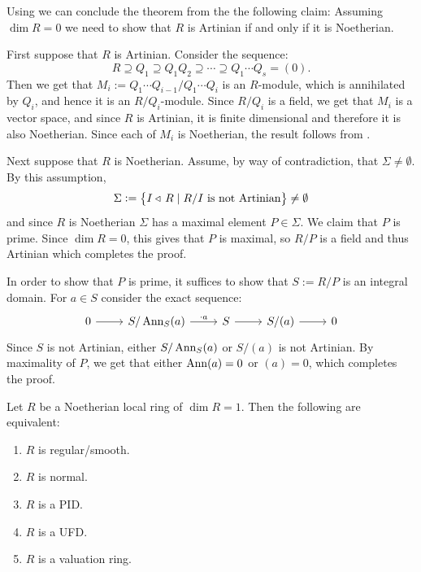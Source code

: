 \documentclass[11pt,a4paper]{article}
\begin{document}
\begin{proofof}{}
  Using  we can conclude the theorem from the
  the following claim:
  Assuming $\dim R = 0$ we need to show that $R$ is Artinian
  if and only if it is Noetherian.

  First suppose that $R$ is Artinian.
  Consider the sequence:
  \[
    R \supseteq Q_1 \supseteq Q_1 Q_2 \supseteq \cdots \supseteq Q_1 \cdots Q_s = (0).
  \]
  Then we get that $M_i := Q_1 \cdots Q_{i-1} / Q_1 \cdots Q_i$ is an $R$-module,
  which is annihilated by $Q_i$, and hence it is an $R/Q_i$-module.
  Since $R/Q_i$ is a field, we get that $M_i$ is a vector space,
  and since $R$ is Artinian, it is finite dimensional and therefore
  it is also Noetherian.
  Since each of $M_i$ is Noetherian,
  the result follows from .

  Next suppose that $R$ is Noetherian.
  Assume, by way of contradiction, that $\Sigma \neq \emptyset$.
  By this assumption,
  \[
    \Sigma := \left\{I \triangleleft\, R \mid \text{$R/I$ is not Artinian}\right\} \neq \emptyset
  \]
  and since $R$ is Noetherian $\Sigma$ has a maximal element $P \in \Sigma$.
  We claim that $P$ is prime.
  Since $\dim R = 0$, this gives that $P$ is maximal,
  so $R/P$ is a field and thus Artinian which completes the proof.

  In order to show that $P$ is prime,
  it suffices to show that $S := R/P$ is an integral domain.
  For $a \in S$ consider the exact sequence:
  \[\begin{tikzcd}
    0 & {S/\Ann_S(a)} & S & {S/(a)} & 0
    \arrow[from=1-1, to=1-2]
    \arrow["{\cdot a}", from=1-2, to=1-3]
    \arrow[from=1-3, to=1-4]
    \arrow[from=1-4, to=1-5]
  \end{tikzcd}\]
  Since $S$ is not Artinian,
  either $S/\operatorname{Ann}_S(a)$ or $S/(a)$ is not Artinian.
  By maximality of $P$,
  we get that either $\operatorname{Ann}(a) = 0$ or $(a) = 0$,
  which completes the proof.
\end{proofof}

\begin{theorem}
  Let $R$ be a Noetherian local ring of $\dim R = 1$.
  Then the following are equivalent:
  \begin{enumerate}
    \item[(1)] $R$ is regular/smooth.
    \item[(2)] $R$ is normal.
    \item[(3)] $R$ is a PID.
    \item[(4)] $R$ is a UFD.
    \item[(5)] $R$ is a valuation ring. %
  \end{enumerate}
\end{theorem}
\end{document}
